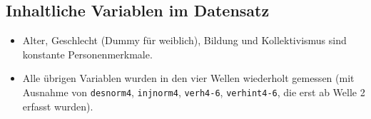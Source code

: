 \documentclass[
]{book}
\providecommand{\tightlist}{%
  \setlength{\itemsep}{0pt}\setlength{\parskip}{0pt}}
\begin{document}
\hypertarget{inhaltliche-variablen-im-datensatz}{%
\subsection*{Inhaltliche Variablen im Datensatz}\label{inhaltliche-variablen-im-datensatz}}

\begin{itemize}
\tightlist
\item
  Alter, Geschlecht (Dummy für weiblich), Bildung und Kollektivismus sind konstante Personenmerkmale.
\item
  Alle übrigen Variablen wurden in den vier Wellen wiederholt gemessen (mit Ausnahme von \texttt{desnorm4}, \texttt{injnorm4}, \texttt{verh4-6}, \texttt{verhint4-6}, die erst ab Welle 2 erfasst wurden).
\end{itemize}
\end{document}

